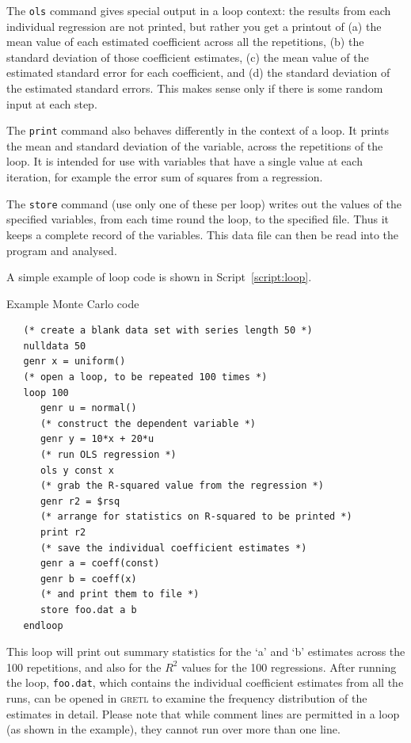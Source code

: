 \documentclass{article}
\begin{document}
The \texttt{ols} command gives special output in a loop context: the
results from each individual regression are not printed, but rather
you get a printout of (a) the mean value of each estimated coefficient
across all the repetitions, (b) the standard deviation of those
coefficient estimates, (c) the mean value of the estimated standard
error for each coefficient, and (d) the standard deviation of the
estimated standard errors.  This makes sense only if there is some
random input at each step.  

The \texttt{print} command also behaves differently in the context of
a loop.  It prints the mean and standard deviation of the variable,
across the repetitions of the loop.  It is intended for use with
variables that have a single value at each iteration, for example the
error sum of squares from a regression.

The \texttt{store} command (use only one of these per loop) writes out
the values of the specified variables, from each time round the loop,
to the specified file.  Thus it keeps a complete record of the
variables.  This data file can then be read into the program and
analysed.

A simple example of loop code is shown in Script~\ref{script:loop}.

\begin{script}[htbp]
\caption{Example Monte Carlo code}
\label{script:loop}
\begin{verbatim}
   (* create a blank data set with series length 50 *)
   nulldata 50
   genr x = uniform()
   (* open a loop, to be repeated 100 times *)
   loop 100
      genr u = normal()
      (* construct the dependent variable *)
      genr y = 10*x + 20*u
      (* run OLS regression *)
      ols y const x
      (* grab the R-squared value from the regression *)
      genr r2 = $rsq
      (* arrange for statistics on R-squared to be printed *)
      print r2
      (* save the individual coefficient estimates *)
      genr a = coeff(const)
      genr b = coeff(x)
      (* and print them to file *)
      store foo.dat a b
   endloop
\end{verbatim}%
\end{script}

This loop will print out summary statistics for the `a' and `b'
estimates across the 100 repetitions, and also for the $R^2$ values
for the 100 regressions.  After running the loop, \texttt{foo.dat},
which contains the individual coefficient estimates from all the runs,
can be opened in \textsc{gretl} to examine the frequency distribution
of the estimates in detail.  Please note that while comment lines are
permitted in a loop (as shown in the example), they cannot run over
more than one line.
\end{document}
